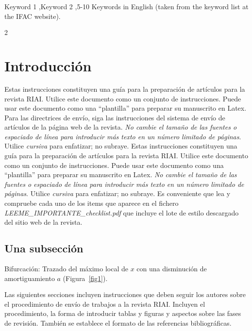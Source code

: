 \documentclass[5p,times,authoryear]{sciarticle}
\begin{document}
\begin{frontmatter}
\begin{keywordIng}
Keyword 1 \sep Keyword 2 \sep 5-10 Keywords in English (taken from the keyword list at the IFAC website).
\end{keywordIng}


\end{frontmatter}

\begin{multicols}{2}   %


\section{Introducción}
Estas instrucciones constituyen una guía para la preparación de
artículos para la revista RIAI. Utilice este documento como un
conjunto de instrucciones. Puede usar este documento como
una ``plantilla'' para preparar su manuscrito en Latex. Para las directrices
de envío, siga las instrucciones del sistema de envío de artículos
de la página web de la revista.
\emph {No cambie el tamaño de las fuentes o espaciado de línea para introducir más texto en un número limitado de páginas}.  Utilice \emph{cursiva} para enfatizar; no subraye.
Estas instrucciones constituyen una guía para la preparación de
artículos para la revista RIAI. Utilice este documento como un
conjunto de instrucciones. Puede usar este documento como
una ``plantilla'' para preparar su manuscrito en Latex.
\emph {No cambie el tamaño de las fuentes o espaciado de línea para introducir más texto en un número limitado de páginas}.  Utilice \emph{cursiva} para enfatizar; no subraye.
Es conveniente que lea y compruebe cada uno de los items que aparece en el fichero \textit{LEEME\_IMPORTANTE\_checklist.pdf} que incluye el lote de estilo descargado del sitio web de la revista.

\subsection{Una subsección}
Bifurcación: Trazado del máximo local de $x$ con una disminución de amortiguamiento $a$ (Figura~\ref{fig1}).

Las siguientes secciones incluyen instrucciones que deben seguir los autores sobre el procedimiento de envío de trabajos a la revista RIAI. Incluyen el procedimiento, la forma de introducir tablas y figuras y aspectos sobre las fases de revisión. También se establece el formato de las referencias bibliográficas.


\end{multicols}
\end{document}
